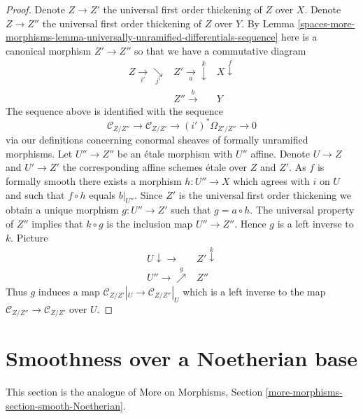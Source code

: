 \begin{proof}
Denote $Z \to Z'$ the universal first order thickening of $Z$ over $X$.
Denote $Z \to Z''$ the universal first order thickening of $Z$ over $Y$.
By
Lemma \ref{spaces-more-morphisms-lemma-universally-unramified-differentials-sequence}
here is a canonical morphism $Z' \to Z''$ so that we have a commutative
diagram
$$
\begin{array}{ccc}Z \underset{i'}{\longrightarrow}\underset{j'}{\searrow} & Z' \underset{a}{\longrightarrow}\overset{k}{\downarrow} & X \overset{f}{\downarrow} \\  & Z'' \overset{b}{\longrightarrow} & Y\end{array}
$$
The sequence above is identified with the sequence
$$
\mathcal{C}_{Z/Z''} \to
\mathcal{C}_{Z/Z'} \to
(i')^*\Omega_{Z'/Z''} \to 0
$$
via our definitions concerning conormal sheaves of formally unramified
morphisms. Let $U'' \to Z''$ be an \'etale morphism with $U''$ affine.
Denote $U \to Z$ and $U' \to Z'$ the corresponding affine
schemes \'etale over $Z$ and $Z'$.
As $f$ is formally smooth there exists a morphism $h : U'' \to X$
which agrees with $i$ on $U$ and such that $f \circ h$ equals $b|_{U''}$.
Since $Z'$ is the universal first order thickening we obtain a unique
morphism $g : U'' \to Z'$ such that $g = a \circ h$. The universal
property of $Z''$ implies that $k \circ g$ is the inclusion map
$U'' \to Z''$. Hence $g$ is a left inverse to $k$. Picture
$$
\begin{array}{cc}U \downarrow\longrightarrow & Z' \overset{k}{\downarrow} \\ U'' \longrightarrow\overset{g}{\nearrow} & Z''\end{array}
$$
Thus $g$ induces a map $\mathcal{C}_{Z/Z'}|_U \to \mathcal{C}_{Z/Z''}|_U$
which is a left inverse to the map
$\mathcal{C}_{Z/Z''} \to \mathcal{C}_{Z/Z'}$ over $U$.
\end{proof}

\section{Smoothness over a Noetherian base}
\label{spaces-more-morphisms-section-smooth-Noetherian}
This section is the analogue of
More on Morphisms, Section \ref{more-morphisms-section-smooth-Noetherian}.

